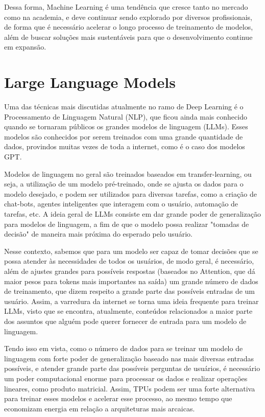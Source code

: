 \documentclass{report}
\begin{document}
Dessa forma, Machine Learning é uma tendência que cresce tanto no mercado como na academia, e deve continuar sendo explorado por diversos profissionais, de forma que é necessário acelerar o longo processo de treinamento de modelos, além de buscar soluções mais sustentáveis para que o desenvolvimento continue em expansão.

\section{Large Language Models}

\setlength{\parskip}{1em}\hspace{0.5cm} Uma das técnicas mais discutidas atualmente no ramo de Deep Learning é o Processamento de Linguagem Natural (NLP), que ficou ainda mais conhecido quando se tornaram públicos os grandes modelos de linguagem (LLMs). Esses modelos são conhecidos por serem treinados com uma grande quantidade de dados, provindos muitas vezes de toda a internet, como é o caso dos modelos GPT.

Modelos de linguagem no geral são treinados baseados em transfer-learning, ou seja, a utilização de um modelo pré-treinado, onde se ajusta os dados para o modelo desejado, e podem ser utilizados para diversas tarefas, como a criação de chat-bots, agentes inteligentes que interagem com o usuário, automação de tarefas, etc. A ideia geral de LLMs consiste em dar grande poder de generalização para modelos de linguagem, a fim de que o modelo possa realizar "tomadas de decisão" de maneira mais próxima do esperado pelo usuário.

Nesse contexto, sabemos que para um modelo ser capaz de tomar decisões que se possa atender às necessidades de todos os usuários, de modo geral, é necessário, além de ajustes grandes para possíveis respostas (baseados no Attention, que dá maior pesos para tokens mais importantes na saída) um grande número de dados de treinamento, que dizem respeito a grande parte das possíveis entradas de um usuário. Assim, a varredura da internet se torna uma ideia frequente para treinar LLMs, visto que se encontra, atualmente, conteúdos relacionados a maior parte dos assuntos que alguém pode querer fornecer de entrada para um modelo de linguagem.

Tendo isso em vista, como o número de dados para se treinar um modelo de linguagem com forte poder de generalização baseado nas mais diversas entradas possíveis, e atender grande parte das possíveis perguntas de usuários, é necessário um poder computacional enorme para processar os dados e realizar operações lineares, como produto matricial. Assim, TPUs podem ser uma forte alternativa para treinar esses modelos e acelerar esse processo, ao mesmo tempo que economizam energia em relação a arquiteturas mais arcaicas.
\end{document}
